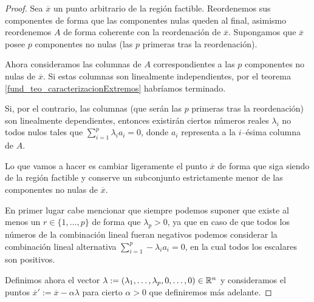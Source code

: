 \begin{proof}
	Sea $\overline{x}$ un punto arbitrario de la región factible. Reordenemos sus componentes de forma que las componentes nulas queden al final, asimismo reordenemos $A$ de forma coherente con la reordenación de $\overline{x}$. Supongamos que $\overline{x}$ posee $p$ componentes no nulas (las $p$ primeras tras la reordenación).
	
	Ahora consideramos las columnas de $A$ correspondientes a las $p$ componentes no nulas de $\overline{x}$. Si estas columnas son linealmente independientes, por el teorema \ref{fund_teo_caracterizacionExtremos} habríamos terminado.
	
	Si, por el contrario, las columnas (que serán las $p$ primeras tras la reordenación) son linealmente dependientes, entonces existirán ciertos números reales $\lambda_i$ no todos nulos tales que $\sum_{i=1}^{p}\lambda_ia_i=0$, donde $a_i$ representa a la $i$--ésima columna de $A$.
	
	Lo que vamos a hacer es cambiar ligeramente el punto $\overline{x}$ de forma que siga siendo de la región factible y conserve un subconjunto estrictamente menor de las componentes no nulas de $\overline{x}$.
	
	En primer lugar cabe mencionar que siempre podemos suponer que existe al menos un $r\in\{1,\dots,p\}$ de forma que $\lambda_p >0$, ya que en caso de que todos los números de la combinación lineal fueran negativos podemos considerar la combinación lineal alternativa $\sum_{i=1}^{p}-\lambda_ia_i=0$, en la cual todos los escalares son positivos.
	
	Definimos ahora el vector $\lambda:=(\lambda_1,\dots,\lambda_p,0,\dots,0)\in\mathbb{R}^n$ y consideramos el puntos $\overline{x}':=\overline{x}-\alpha\lambda$ para cierto $\alpha>0$ que definiremos más adelante.
	

\end{proof}
